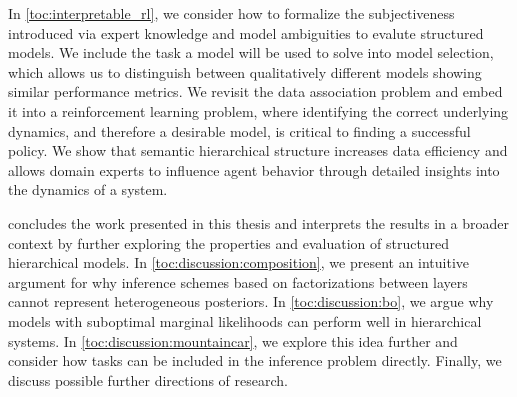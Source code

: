 In \cref{toc:interpretable_rl}, we consider how to formalize the subjectiveness introduced via expert knowledge and model ambiguities to evalute structured models.
We include the task a model will be used to solve into model selection, which allows us to distinguish between qualitatively different models showing similar performance metrics.
We revisit the data association problem and embed it into a reinforcement learning problem, where identifying the correct underlying dynamics, and therefore a desirable model, is critical to finding a successful policy.
We show that semantic hierarchical structure increases data efficiency and allows domain experts to influence agent behavior through detailed insights into the dynamics of a system.

 concludes the work presented in this thesis and interprets the results in a broader context by further exploring the properties and evaluation of structured hierarchical models.
In \cref{toc:discussion:composition}, we present an intuitive argument for why inference schemes based on factorizations between layers cannot represent heterogeneous posteriors.
In \cref{toc:discussion:bo}, we argue why models with suboptimal marginal likelihoods can perform well in hierarchical systems.
In \cref{toc:discussion:mountaincar}, we explore this idea further and consider how tasks can be included in the inference problem directly.
Finally, we discuss possible further directions of research.
